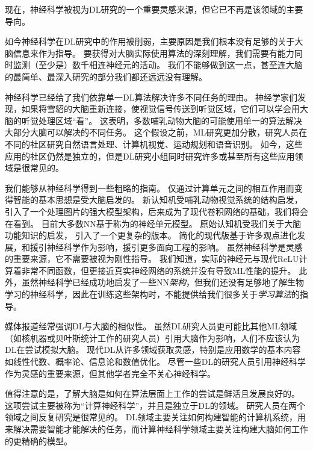 现在，神经科学被视为\gls{DL}研究的一个重要灵感来源，但它已不再是该领域的主要导向。


如今神经科学在\gls{DL}研究中的作用被削弱，主要原因是我们根本没有足够的关于大脑信息来作为指导。
要获得对大脑实际使用算法的深刻理解，我们需要有能力同时监测（至少是）数千相连神经元的活动。
我们不能够做到这一点，甚至连大脑的最简单、最深入研究的部分我们都还远远没有理解\citep{olshausen:2005}。

神经科学已经给了我们依靠单一\gls{DL}算法解决许多不同任务的理由。
神经学家们发现，如果将雪貂的大脑重新连接，使视觉信号传送到听觉区域，它们可以学会用大脑的听觉处理区域``看''\citep{von2000visual}。
这表明，多数哺乳动物大脑的可能使用单一的算法解决大部分大脑可以解决的不同任务。
这个假设之前，\gls{ML}研究更加分散，研究人员在不同的社区研究自然语言处理、计算机视觉、运动规划和语音识别。
如今，这些应用的社区仍然是独立的，但是\gls{DL}研究小组同时研究许多或甚至所有这些应用领域是很常见的。

我们能够从神经科学得到一些粗略的指南。
仅通过计算单元之间的相互作用而变得智能的基本思想是受大脑启发的。
新认知机\citep{Fukushima80}受哺乳动物视觉系统的结构启发，引入了一个处理图片的强大模型架构，后来成为了现代卷积网络的基础\citep{LeCun98-small}，我们将会在看到。
目前大多数\gls{NN}基于称为的神经单元模型。
原始认知机\citep{Fukushima75}受我们关于大脑功能知识的启发， 引入了一个更复杂的版本。
简化的现代版基于许多观点进化发展，\citet{Nair-2010}和\citet{Glorot+al-AI-2011-small}援引神经科学作为影响，\citet{Jarrett-ICCV2009}援引更多面向工程的影响。
虽然神经科学是灵感的重要来源，它不需要被视为刚性指导。
我们知道，实际的神经元与现代\gls{ReLU}计算着非常不同函数，但更接近真实神经网络的系统并没有导致\gls{ML}性能的提升。
此外，虽然神经科学已经成功地启发了一些\gls{NN}\emph{架构}，但我们还没有足够地了解生物学习的神经科学，因此在训练这些架构时，不能提供给我们很多关于\emph{学习算法}的指导。

媒体报道经常强调\gls{DL}与大脑的相似性。
虽然\gls{DL}研究人员更可能比其他\gls{ML}领域（如核机器或贝叶斯统计工作的研究人员）引用大脑作为影响，人们不应该认为\gls{DL}在尝试模拟大脑。
现代\gls{DL}从许多领域获取灵感，特别是应用数学的基本内容如线性代数、概率论、信息论和数值优化。
尽管一些\gls{DL}的研究人员引用神经科学作为灵感的重要来源，但其他学者完全不关心神经科学。


值得注意的是，了解大脑是如何在算法层面上工作的尝试是鲜活且发展良好的。
这项尝试主要被称为``计算神经科学''，并且是独立于\gls{DL}的领域。
研究人员在两个领域之间反复研究是很常见的。
\gls{DL}领域主要关注如何构建智能的计算机系统，用来解决需要智能才能解决的任务，而计算神经科学领域主要关注构建大脑如何工作的更精确的模型。

